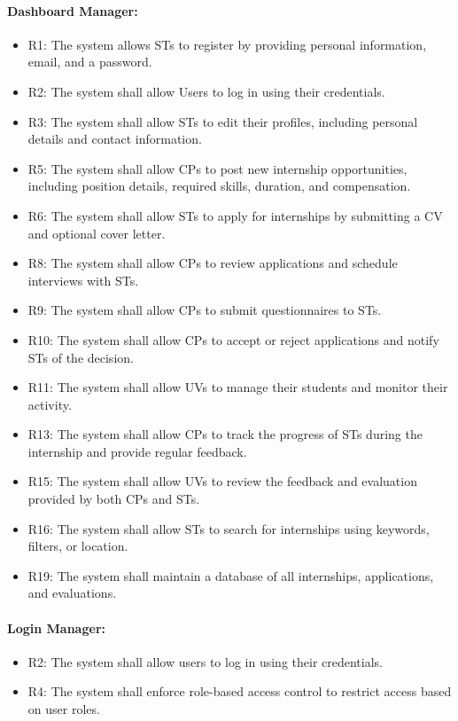 \paragraph{Dashboard Manager:}
\begin{itemize}
    \item R1: The system allows STs to register by providing personal information, email, and a password.
    \item R2: The system shall allow Users to log in using their credentials.
    \item R3: The system shall allow STs to edit their profiles, including personal details and contact information.
    \item R5: The system shall allow CPs to post new internship opportunities, including position details, required skills, duration, and compensation.
    \item R6: The system shall allow STs to apply for internships by submitting a CV and optional cover letter.
    \item R8: The system shall allow CPs to review applications and schedule interviews with STs.
    \item R9: The system shall allow CPs to submit questionnaires to STs.
    \item R10: The system shall allow CPs to accept or reject applications and notify STs of the decision.
    \item R11: The system shall allow UVs to manage their students and monitor their activity.
    \item R13: The system shall allow CPs to track the progress of STs during the internship and provide regular feedback.
    \item R15: The system shall allow UVs to review the feedback and evaluation provided by both CPs and STs.
    \item R16: The system shall allow STs to search for internships using keywords, filters, or location.
    \item R19: The system shall maintain a database of all internships, applications, and evaluations.
\end{itemize}

\paragraph{Login Manager:}
\begin{itemize}
    \item R2: The system shall allow users to log in using their credentials.
    \item R4: The system shall enforce role-based access control to restrict access based on user roles.
\end{itemize}

